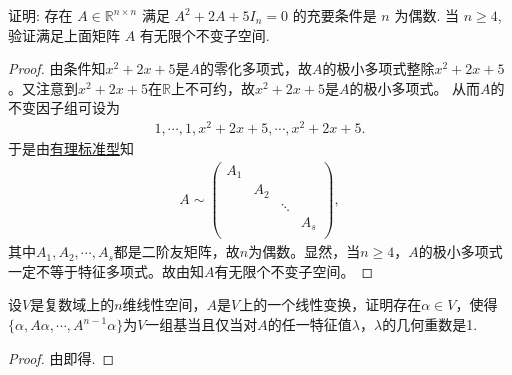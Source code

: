 \documentclass[../../main.tex]{subfiles}%
\begin{document}
\begin{example}
证明: 存在 \( A \in \mathbb{R}^{n \times n} \) 满足 \( A^2 + 2A + 5I_n = 0 \) 的充要条件是 \( n \) 为偶数. 当 \( n \geqslant 4 \), 验证满足上面矩阵 \( A \) 有无限个不变子空间.
\end{example}
\begin{proof}

由条件知$x^2+2x+5$是$A$的零化多项式，故$A$的极小多项式整除$x^2+2x+5$。又注意到$x^2+2x+5$在$\mathbb{R}$上不可约，故$x^2+2x+5$是$A$的极小多项式。
从而$A$的不变因子组可设为
\begin{align*}
1,\cdots ,1,x^2+2x+5,\cdots ,x^2+2x+5.
\end{align*}
于是由\hyperref[theorem:有理标准型核心定理]{有理标准型}知
\begin{align*}
A\sim \begin{pmatrix}
A_1&		&		&		\\
&		A_2&		&		\\
&		&		\ddots&		\\
&		&		&		A_s\\
\end{pmatrix},
\end{align*}
其中$A_1,A_2,\cdots ,A_s$都是二阶友矩阵，故$n$为偶数。显然，当$n\geqslant 4$，$A$的极小多项式一定不等于特征多项式。故由知$A$有无限个不变子空间。

\end{proof}

\begin{example}
设\( V \)是复数域上的\( n \)维线性空间，\( A \)是\( V \)上的一个线性变换，证明存在\( \alpha \in V \)，使得\( \{ \alpha, A\alpha, \cdots, A^{n-1}\alpha \} \)为\( V \)一组基当且仅当对\( A \)的任一特征值\( \lambda \)，\( \lambda \)的几何重数是1.
\end{example}
\begin{proof}

由即得.

\end{proof}
\end{document}
